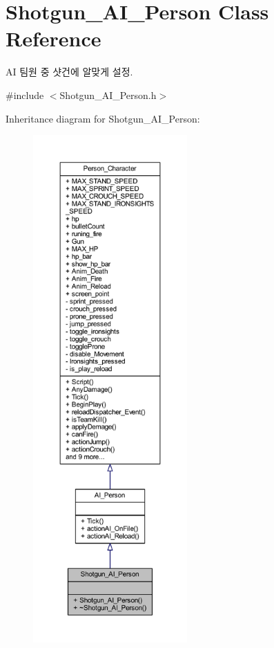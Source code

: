 \hypertarget{class_shotgun___a_i___person}{}\section{Shotgun\+\_\+\+A\+I\+\_\+\+Person Class Reference}
\label{class_shotgun___a_i___person}


AI 팀원 중 샷건에 알맞게 설정.  




{\ttfamily \#include $<$Shotgun\+\_\+\+A\+I\+\_\+\+Person.\+h$>$}



Inheritance diagram for Shotgun\+\_\+\+A\+I\+\_\+\+Person\+:\nopagebreak
\begin{figure}[H]
\begin{center}
\leavevmode
\includegraphics[height=550pt]{class_shotgun___a_i___person__inherit__graph}
\end{center}
\end{figure}


